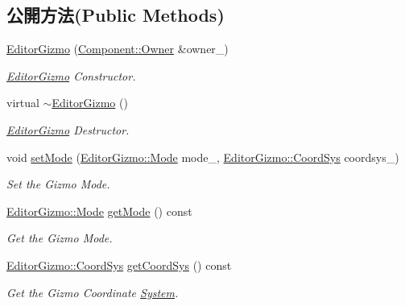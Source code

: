 \subsection*{公開方法(Public Methods)}
\begin{DoxyCompactItemize}
\item 
\hyperlink{class_i_dream_sky_1_1_editor_gizmo_a062469ef365f32c44d73956042078c1a}{Editor\+Gizmo} (\hyperlink{class_i_dream_sky_1_1_component_1_1_owner}{Component\+::\+Owner} \&owner\+\_\+)
\begin{DoxyCompactList}\small\item\em \hyperlink{class_i_dream_sky_1_1_editor_gizmo}{Editor\+Gizmo} Constructor. \end{DoxyCompactList}\item 
virtual \hyperlink{class_i_dream_sky_1_1_editor_gizmo_a1cb32e3c3f7fee6c1e2d7cc10a14718e}{$\sim$\+Editor\+Gizmo} ()
\begin{DoxyCompactList}\small\item\em \hyperlink{class_i_dream_sky_1_1_editor_gizmo}{Editor\+Gizmo} Destructor. \end{DoxyCompactList}\item 
void \hyperlink{class_i_dream_sky_1_1_editor_gizmo_a7969b643728532494df9ff05814808f7}{set\+Mode} (\hyperlink{class_i_dream_sky_1_1_editor_gizmo_ac4d72bcb586f548ceaba02af53340394}{Editor\+Gizmo\+::\+Mode} mode\+\_\+, \hyperlink{class_i_dream_sky_1_1_editor_gizmo_a907a83f34db5629458b5c1da4d13f35f}{Editor\+Gizmo\+::\+Coord\+Sys} coordsys\+\_\+)
\begin{DoxyCompactList}\small\item\em Set the Gizmo Mode. \end{DoxyCompactList}\item 
\hyperlink{class_i_dream_sky_1_1_editor_gizmo_ac4d72bcb586f548ceaba02af53340394}{Editor\+Gizmo\+::\+Mode} \hyperlink{class_i_dream_sky_1_1_editor_gizmo_a821b3f473c337fb4175ba956caa46509}{get\+Mode} () const 
\begin{DoxyCompactList}\small\item\em Get the Gizmo Mode. \end{DoxyCompactList}\item 
\hyperlink{class_i_dream_sky_1_1_editor_gizmo_a907a83f34db5629458b5c1da4d13f35f}{Editor\+Gizmo\+::\+Coord\+Sys} \hyperlink{class_i_dream_sky_1_1_editor_gizmo_a985277780cbf46f6a7f0c9e822b0c47a}{get\+Coord\+Sys} () const 
\begin{DoxyCompactList}\small\item\em Get the Gizmo Coordinate \hyperlink{class_i_dream_sky_1_1_system}{System}. \end{DoxyCompactList}\item 

\end{DoxyCompactItemize}

